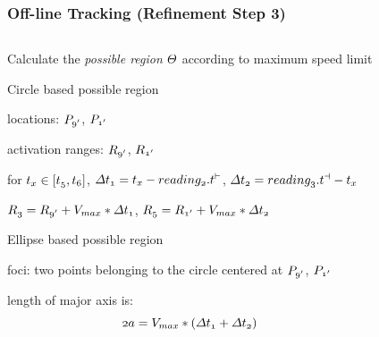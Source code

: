 \begin{frame}
\frametitle{Off-line Tracking (Refinement Step 3)}

\begin{columns}[c]

\begin{itemize}
\scriptsize{
  \item Calculate the \emph{possible region} $\mathnormal{\Theta}$ according to maximum speed limit

  \item Circle based possible region
    \begin{itemize}
      \tiny{
        \item locations: $\mathnormal{P_{9'}}$, $\mathnormal{P_{1'}}$
        \item activation ranges: $\mathnormal{R_{9'}}$, $\mathnormal{R_{1'}}$
        \item for $\mathnormal{t_x \in [ t_5, t_6 ]}$, $\mathnormal{\Delta t_1 = t_x - reading_2.t^{\vdash}}$, $\mathnormal{\Delta t_2 = reading_3.t^{\dashv} - t_x}$
        \item $\mathnormal{R_3 = R_{9'} + V_{max} * \Delta t_1}$, $\mathnormal{R_5 = R_{1'} + V_{max} * \Delta t_2}$
      }
    \end{itemize}

  \item Ellipse based possible region
  \begin{itemize}
      \tiny{
        \item foci: two points belonging to the circle centered at $\mathnormal{P_{9'}}$, $\mathnormal{P_{1'}}$
        \item length of major axis is:
          \begin{equation*}
            \mathnormal{2a = V_{max} * (\Delta t_1 + \Delta t_2)}
          \end{equation*}
      }
  \end{itemize}
}
\end{itemize}


\end{columns}
\end{frame}
